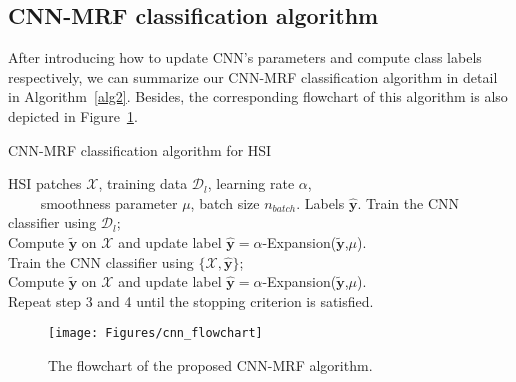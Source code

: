 \documentclass[journal]{IEEEtran}
\begin{document}
	{{
			\subsection{CNN-MRF classification algorithm}
			After introducing how to update CNN's parameters and compute class labels respectively, we can summarize our CNN-MRF classification algorithm in detail in Algorithm~\ref{alg2}. Besides, the corresponding flowchart of this algorithm is also depicted in Figure~\ref{flowchart}. 
		}}
		\begin{algorithm}[H]
			\caption{{{CNN-MRF classification algorithm for HSI}}} \label{alg2}
			\begin{algorithmic}[1]
				\REQUIRE HSI patches $\mathbf{\mathcal{X}}$, training data $\mathbf{\mathcal{D}}_{l}$, learning rate $\alpha$,\\ ~~~~ smoothness parameter $\mu$, batch size $n_{batch}$.
				\ENSURE Labels $\widehat{\mathbf{y}}$.
				{{
						\STATE Train the CNN classifier using $\mathbf{\mathcal{D}}_{l}$;\\
						\STATE Compute $\widetilde{\mathbf{y}}$ on $\mathcal{X}$ and update label $\widehat{\mathbf{y}}=\alpha$-Expansion($\widetilde{\mathbf{y}}$,$\mu$).\\
						\STATE Train the CNN classifier using $\{\mathcal{X},\widehat{\mathbf{y}}\}$; \\
						\STATE Compute $\widetilde{\mathbf{y}}$ on $\mathcal{X}$ and update label $\widehat{\mathbf{y}}=\alpha$-Expansion($\widetilde{\mathbf{y}}$,$\mu$).\\
						\STATE Repeat step 3 and 4 until the stopping criterion is satisfied.}} 
			\end{algorithmic}
		\end{algorithm}
		
		\begin{figure}[t]
			\centering
			\texttt{[image: Figures/cnn\_flowchart]}
			\caption{{{The flowchart of the proposed CNN-MRF algorithm.}}}\label{flowchart}
		\end{figure}
		
\end{document}
